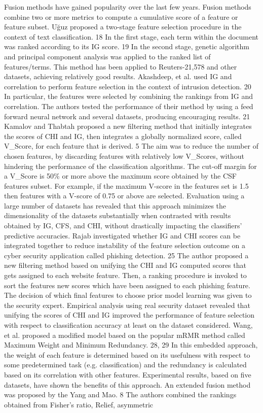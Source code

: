 \documentclass[review]{elsarticle}
\begin{document}
Fusion methods have gained popularity over the last few years. Fusion methods combine two or more metrics to compute a cumulative score of a feature or feature subset. Uğuz  proposed a two-stage feature selection procedure in the context of text classification. \cite{Uguz2011} 18 In the first stage, each term within the document was ranked according to its IG score.\cite{Salzberg1994} 19  In the second stage, genetic algorithm and principal component analysis was applied to the ranked list of features/terms.  This method has been applied to Reuters-21,578 and other datasets, achieving relatively good results.  Akashdeep, et al. used IG and correlation to perform feature selection in the context of intrusion detection.\cite{Abedinia2017} 20  In particular, the features were selected by combining the rankings from IG and correlation. The authors tested the performance of their method by using a feed forward neural network  and several datasets, producing encouraging results.\cite{Shahamiri2012} 21  Kamalov and Thabtah proposed a new filtering method that initially integrates the scores of CHI and IG, then integrates a globally normalized score, called V\_Score, for each feature that is derived.\cite{Kamalov2017} 5 The aim was to reduce the number of chosen features, by discarding features with relatively low V\_Scores, without hindering the performance of the classification algorithms. The cut-off margin for a V\_Score is 50\% or more above the maximum score obtained by the CSF features subset. For example, if the maximum V-score in the features set is 1.5 then features with a V-score of 0.75 or above are selected. Evaluation using a large number of datasets has revealed that this approach minimizes the dimensionality of the datasets substantially when contrasted with results obtained by IG, CFS, and CHI, without drastically impacting the classifiers’ predictive accuracies.  Rajab investigated whether IG and CHI scores can be integrated together to reduce instability of the feature selection outcome on a cyber security application called phishing detection. \cite{Rajab2017} 25  The author proposed a new filtering method based on unifying the CHI and IG computed  scores that gets assigned to each website feature. Then, a ranking procedure is invoked to sort the features new scores which have been assigned to each phishing feature. The decision of which final features to choose prior model learning was given to the security expert. Empirical analysis using real security dataset revealed that unifying the scores of CHI and IG improved the performance of feature selection with respect to classification accuracy at least on the dataset considered. Wang, et al. proposed a modified model based on the popular mRMR method called Maximum Weight and Minimum Redundancy. \cite{Yousef2016,Wang2013}28, 29  In this embedded approach, the weight of each feature is determined based on its usefulness with respect to some predetermined task (e.g. classification) and the redundancy is calculated based on its correlation with other features. Experimental results, based on five datasets, have shown the benefits of this approach. An extended fusion method was proposed by the Yang and Mao. \cite{FengYang2011} 8 The authors combined the rankings obtained from Fisher’s ratio, Relief, asymmetric 
\end{document}
